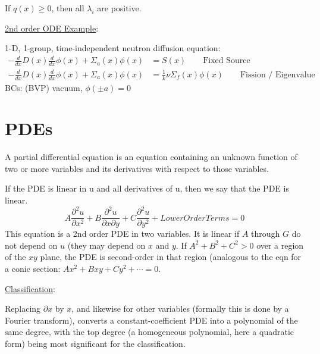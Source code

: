 \documentclass[12pt]{article}
\newcommand{\Macro}{\ensuremath{\Sigma}}
\begin{document}
If $q(x) \geq 0$, then all $\lambda_i$ are positive.

\vspace*{1em}
\noindent \underline{2nd order ODE Example}:

1-D, 1-group, time-independent neutron diffusion equation:
%
\begin{align}
-\frac{d}{dx}D(x)\frac{d}{dx}\phi(x) + \Macro_a(x)\phi(x) &= S(x) \qquad \text{Fixed Source} \nonumber \\
-\frac{d}{dx}D(x)\frac{d}{dx}\phi(x) + \Macro_a(x)\phi(x) &= \frac{1}{k} \nu \Macro_f(x) \phi(x)\qquad \text{Fission / Eigenvalue} \nonumber
\end{align}
%
BCs: (BVP) vacuum, $\phi(\pm a) = 0$

\section{PDEs}

A partial differential equation is an equation containing an unknown function of two or more variables and its derivatives with respect to those variables. 

If the PDE is linear in u and all derivatives of u, then we say that the PDE is linear.
%
\begin{equation}
A\frac{\partial^2 u}{\partial x^2} + B\frac{\partial^2 u}{\partial x \partial  y} + C\frac{\partial^2 u}{\partial y^2} + Lower Order Terms = 0 \nonumber
\end{equation}
%
This equation is a 2nd order PDE in two variables. It is linear if $A$ through $G$ do not depend on $u$ (they may depend on $x$ and $y$. If $A^2 + B^2 + C^2 > 0$ over a region of the $xy$ plane, the PDE is second-order in that region (analogous to the eqn for a conic section: $Ax^2 + Bxy + Cy^2 + \cdots = 0$. 

\vspace*{1em}
\noindent \underline{Classification}:%

Replacing $\partial x$ by $x$, and likewise for other variables (formally this is done by a Fourier transform), converts a constant-coefficient PDE into a polynomial of the same degree, with the top degree (a homogeneous polynomial, here a quadratic form) being most significant for the classification.
\end{document}
